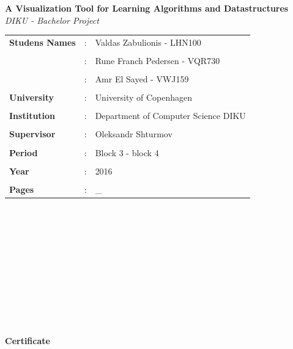 \documentclass[11pt]{article}
\begin{document}
\clearpage\maketitle
\thispagestyle{empty}
\newpage
\begin{center}{\huge\textbf{A Visualization Tool for Learning Algorithms and Datastructures}}\newline \textit{\\DIKU - Bachelor Project}\end{center}
\hfill \break
\begin{tabular}{l l l }
\textbf{Studens Names} &: &Valdas Zabulionis - LHN100\\\\
&: &Rune Franch Pedersen - VQR730\\\\
&: &Amr El Sayed - VWJ159\\\\
\textbf{University} &:& University of Copenhagen\\\\
\textbf{Institution} &:& Department of Computer Science DIKU\\\\
\textbf{Supervisor} &:& Oleksandr Shturmov\\\\
\textbf{Period} &:& Block 3 - block 4\\\\
\textbf{Year} &:& 2016\\\\
\textbf{Pages} &:& \_\\
\end{tabular}
\\\\\\\\\\\\\\\\\\\\
\begin{center}{\huge\textbf{Certificate}}\end{center}
\end{document}
